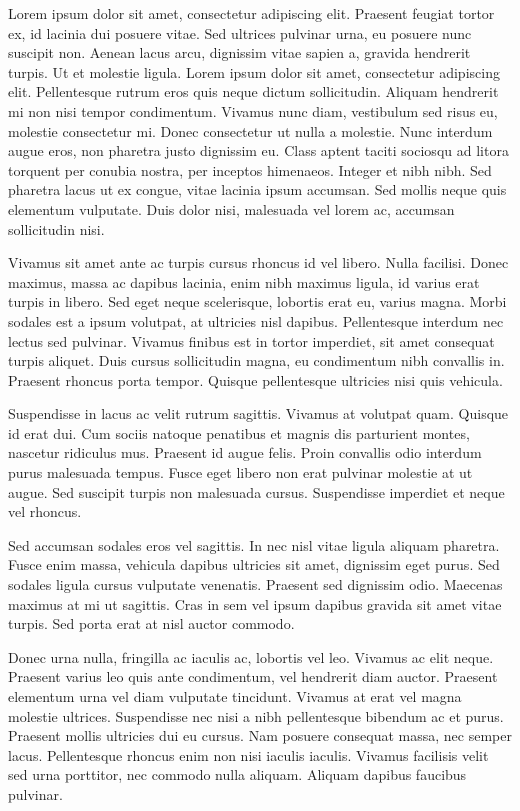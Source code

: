 Lorem ipsum dolor sit amet, consectetur adipiscing elit. Praesent feugiat tortor ex, id lacinia dui posuere vitae. Sed ultrices pulvinar urna, eu posuere nunc suscipit non. Aenean lacus arcu, dignissim vitae sapien a, gravida hendrerit turpis. Ut et molestie ligula. Lorem ipsum dolor sit amet, consectetur adipiscing elit. Pellentesque rutrum eros quis neque dictum sollicitudin. Aliquam hendrerit mi non nisi tempor condimentum. Vivamus nunc diam, vestibulum sed risus eu, molestie consectetur mi. Donec consectetur ut nulla a molestie. Nunc interdum augue eros, non pharetra justo dignissim eu. Class aptent taciti sociosqu ad litora torquent per conubia nostra, per inceptos himenaeos. Integer et nibh nibh. Sed pharetra lacus ut ex congue, vitae lacinia ipsum accumsan. Sed mollis neque quis elementum vulputate. Duis dolor nisi, malesuada vel lorem ac, accumsan sollicitudin nisi.

Vivamus sit amet ante ac turpis cursus rhoncus id vel libero. Nulla facilisi. Donec maximus, massa ac dapibus lacinia, enim nibh maximus ligula, id varius erat turpis in libero. Sed eget neque scelerisque, lobortis erat eu, varius magna. Morbi sodales est a ipsum volutpat, at ultricies nisl dapibus. Pellentesque interdum nec lectus sed pulvinar. Vivamus finibus est in tortor imperdiet, sit amet consequat turpis aliquet. Duis cursus sollicitudin magna, eu condimentum nibh convallis in. Praesent rhoncus porta tempor. Quisque pellentesque ultricies nisi quis vehicula.

Suspendisse in lacus ac velit rutrum sagittis. Vivamus at volutpat quam. Quisque id erat dui. Cum sociis natoque penatibus et magnis dis parturient montes, nascetur ridiculus mus. Praesent id augue felis. Proin convallis odio interdum purus malesuada tempus. Fusce eget libero non erat pulvinar molestie at ut augue. Sed suscipit turpis non malesuada cursus. Suspendisse imperdiet et neque vel rhoncus.

Sed accumsan sodales eros vel sagittis. In nec nisl vitae ligula aliquam pharetra. Fusce enim massa, vehicula dapibus ultricies sit amet, dignissim eget purus. Sed sodales ligula cursus vulputate venenatis. Praesent sed dignissim odio. Maecenas maximus at mi ut sagittis. Cras in sem vel ipsum dapibus gravida sit amet vitae turpis. Sed porta erat at nisl auctor commodo.

Donec urna nulla, fringilla ac iaculis ac, lobortis vel leo. Vivamus ac elit neque. Praesent varius leo quis ante condimentum, vel hendrerit diam auctor. Praesent elementum urna vel diam vulputate tincidunt. Vivamus at erat vel magna molestie ultrices. Suspendisse nec nisi a nibh pellentesque bibendum ac et purus. Praesent mollis ultricies dui eu cursus. Nam posuere consequat massa, nec semper lacus. Pellentesque rhoncus enim non nisi iaculis iaculis. Vivamus facilisis velit sed urna porttitor, nec commodo nulla aliquam. Aliquam dapibus faucibus pulvinar.